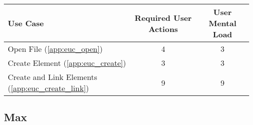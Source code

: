


\begin{tabularx}{\textwidth}{Xcc}
\textbf{Use Case} & \textbf{Required User Actions} & \textbf{User Mental Load}\\
\hline
Open File (\ref{app:euc_open})                       & 4 & 3 \\
Create Element (\ref{app:euc_create})                & 3 & 3 \\
Create and Link Elements (\ref{app:euc_create_link}) & 9 & 9
\end{tabularx}

\subsection*{Max}




